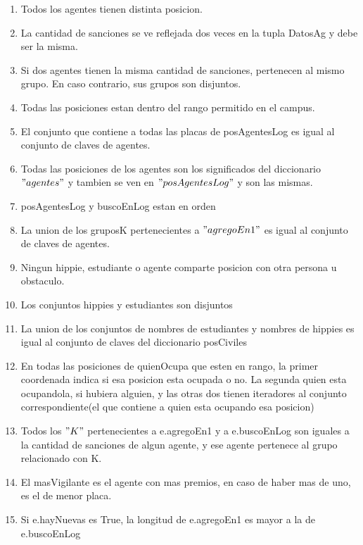\hspace*{\disSubSubSecMargen}
\begin{enumerate}
\setlength{\itemindent}{3em}
  \item Todos los agentes tienen distinta posicion.
  \item La cantidad de sanciones se ve reflejada dos veces en la tupla DatosAg y debe ser la misma.
  \item Si dos agentes tienen la misma cantidad de sanciones, pertenecen al mismo grupo. En caso contrario, sus grupos son disjuntos.
  \item Todas las posiciones estan dentro del rango permitido en el campus.
  \item El conjunto que contiene a todas las placas de posAgentesLog es igual al conjunto de claves de agentes. 
  \item Todas las posiciones de los agentes son los significados del diccionario $"agentes"$ y tambien se ven en $"posAgentesLog"$ y son las mismas.
    \item posAgentesLog y buscoEnLog estan en orden

  \item La union de los gruposK pertenecientes a $"agregoEn1"$ es igual al conjunto de claves de agentes.
  \item Ningun hippie, estudiante o agente comparte posicion con otra persona u obstaculo.
    \item Los conjuntos hippies y estudiantes son disjuntos

  \item La union de los conjuntos de nombres de estudiantes y nombres de hippies es igual al conjunto de claves del diccionario posCiviles
  \item En todas las posiciones de quienOcupa que esten en rango, la primer coordenada indica si esa posicion esta ocupada o no. La segunda quien esta ocupandola, si hubiera alguien, y las otras dos tienen iteradores al conjunto correspondiente(el que contiene a quien esta ocupando esa posicion)
  \item Todos los $"K"$ pertenecientes a e.agregoEn1 y a e.buscoEnLog son iguales a la cantidad de sanciones de algun agente, y ese agente pertenece al grupo relacionado con K.
  \item El masVigilante es el agente con mas premios, en caso de haber mas de uno, es el de menor placa.
  \item Si e.hayNuevas es True, la longitud de e.agregoEn1 es mayor a la de e.buscoEnLog
  
\end{enumerate}

